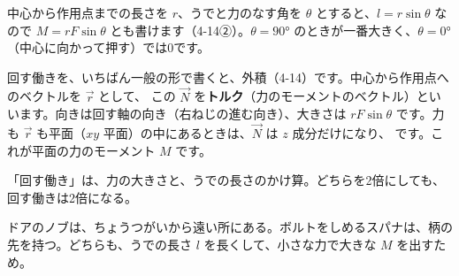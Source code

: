 \par\vspace{4pt}
\noindent 中心から作用点までの長さを $r$、うでと力のなす角を $\theta$ とすると、$l=r\sin\theta$ なので $M=rF\sin\theta$ とも書けます（4-14②）。$\theta=90°$ のときが一番大きく、$\theta=0°$（中心に向かって押す）では0です。

回す働きを、いちばん一般の形で書くと、外積（4-14）です。中心から作用点へのベクトルを $\vec r$ として、
この $\vec N$ を\textbf{トルク}（力のモーメントのベクトル）といいます。向きは回す軸の向き（右ねじの進む向き）、大きさは $rF\sin\theta$ です。力も $\vec r$ も平面（$xy$ 平面）の中にあるときは、$\vec N$ は $z$ 成分だけになり、
です。これが平面の力のモーメント $M$ です。\label{ph:力-5:moment}

\begin{phflow}[力のモーメント]
\end{phflow}

\begin{phyomi}[$M=Fl$]
「回す働き」は、力の大きさと、うでの長さのかけ算。どちらを2倍にしても、回す働きは2倍になる。
\end{phyomi}
\begin{phmijika}[ドアのノブとスパナ]
ドアのノブは、ちょうつがいから遠い所にある。ボルトをしめるスパナは、柄の先を持つ。どちらも、うでの長さ $l$ を長くして、小さな力で大きな $M$ を出すため。
\end{phmijika}

